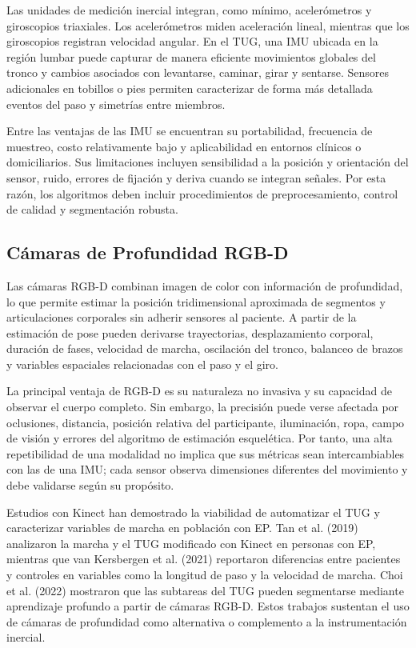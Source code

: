 \documentclass[12pt,a4paper]{article}
\begin{document}
Las unidades de medición inercial integran, como mínimo, acelerómetros y giroscopios triaxiales. Los acelerómetros miden aceleración lineal, mientras que los giroscopios registran velocidad angular. En el TUG, una IMU ubicada en la región lumbar puede capturar de manera eficiente movimientos globales del tronco y cambios asociados con levantarse, caminar, girar y sentarse. Sensores adicionales en tobillos o pies permiten caracterizar de forma más detallada eventos del paso y simetrías entre miembros.

Entre las ventajas de las IMU se encuentran su portabilidad, frecuencia de muestreo, costo relativamente bajo y aplicabilidad en entornos clínicos o domiciliarios. Sus limitaciones incluyen sensibilidad a la posición y orientación del sensor, ruido, errores de fijación y deriva cuando se integran señales. Por esta razón, los algoritmos deben incluir procedimientos de preprocesamiento, control de calidad y segmentación robusta.

\subsection{Cámaras de Profundidad RGB-D}\label{sec:rgbd}

Las cámaras RGB-D combinan imagen de color con información de profundidad, lo que permite estimar la posición tridimensional aproximada de segmentos y articulaciones corporales sin adherir sensores al paciente. A partir de la estimación de pose pueden derivarse trayectorias, desplazamiento corporal, duración de fases, velocidad de marcha, oscilación del tronco, balanceo de brazos y variables espaciales relacionadas con el paso y el giro.

La principal ventaja de RGB-D es su naturaleza no invasiva y su capacidad de observar el cuerpo completo. Sin embargo, la precisión puede verse afectada por oclusiones, distancia, posición relativa del participante, iluminación, ropa, campo de visión y errores del algoritmo de estimación esquelética. Por tanto, una alta repetibilidad de una modalidad no implica que sus métricas sean intercambiables con las de una IMU; cada sensor observa dimensiones diferentes del movimiento y debe validarse según su propósito.

Estudios con Kinect han demostrado la viabilidad de automatizar el TUG y caracterizar variables de marcha en población con EP. Tan et al. (2019) analizaron la marcha y el TUG modificado con Kinect en personas con EP, mientras que van Kersbergen et al. (2021) reportaron diferencias entre pacientes y controles en variables como la longitud de paso y la velocidad de marcha. Choi et al. (2022) mostraron que las subtareas del TUG pueden segmentarse mediante aprendizaje profundo a partir de cámaras RGB-D. Estos trabajos sustentan el uso de cámaras de profundidad como alternativa o complemento a la instrumentación inercial.
\end{document}
